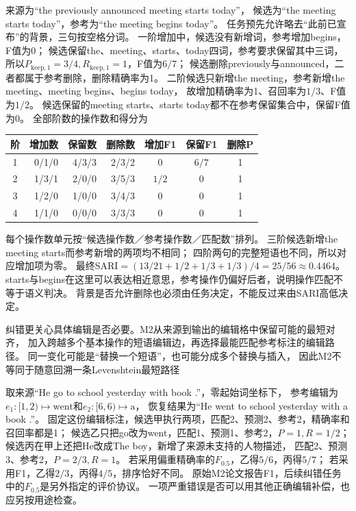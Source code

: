 来源为“the previously announced meeting starts today”，
候选为“the meeting starts today”，参考为“the meeting begins today”。
任务预先允许略去“此前已宣布”的背景，三句按空格分词。
一阶增加中，候选没有新增词，参考增加begins，F值为0；
候选保留the、meeting、starts、today四词，参考要求保留其中三词，
所以$P_{\mathrm{keep},1}=3/4,R_{\mathrm{keep},1}=1$，F值为$6/7$；
候选删除previously与announced，二者都属于参考删除，删除精确率为1。
二阶候选只新增the meeting，参考新增the meeting、meeting begins、begins today，
故增加精确率为1、召回率为$1/3$、F值为$1/2$。
候选保留的meeting starts、starts today都不在参考保留集合中，保留F值为0。
全部阶数的操作数和得分为
\begin{center}
  \small
  \begin{tabular}{@{}crrrccc@{}}
    \toprule
    阶 & 增加数 & 保留数 & 删除数 & 增加F1 & 保留F1 & 删除P\\
    \midrule
    1 & 0/1/0 & 4/3/3 & 2/3/2 & 0 & $6/7$ & 1\\
    2 & 1/3/1 & 2/0/0 & 3/5/3 & $1/2$ & 0 & 1\\
    3 & 1/2/0 & 1/0/0 & 3/4/3 & 0 & 0 & 1\\
    4 & 1/1/0 & 0/0/0 & 3/3/3 & 0 & 0 & 1\\
    \bottomrule
  \end{tabular}
\end{center}
每个操作数单元按“候选操作数／参考操作数／匹配数”排列。
三阶候选新增the meeting starts而参考新增的两项均不相同；
四阶两句的完整短语也不同，所以对应增加项为零。
最终$\mathrm{SARI}=(13/21+1/2+1/3+1/3)/4=25/56\approx0.4464$。
starts与begins在这里可以表达相近意思，参考操作仍偏好后者，说明操作匹配不等于语义判决。
背景是否允许删除也必须由任务决定，不能反过来由SARI高低决定。

纠错更关心具体编辑是否必要。M2从来源到输出的编辑格中保留可能的最短对齐，
加入跨越多个基本操作的短语编辑边，再选择最能匹配参考标注的编辑路径。
同一变化可能是“替换一个短语”，也可能分成多个替换与插入，
因此M2不等同于随意回溯一条Levenshtein最短路径

取来源“He go to school yesterday with book .”，零起始词坐标下，
参考编辑为$e_1: [1,2)\mapsto\text{went}$和$e_2:[6,6)\mapsto\text{a}$，
恢复结果为“He went to school yesterday with a book .”。
固定这份编辑标注，候选甲执行两项，匹配2、预测2、参考2，精确率和召回率都是1；
候选乙只把go改为went，匹配1、预测1、参考2，$P=1,R=1/2$；
候选丙在甲上还把He改成The boy，新增了来源未支持的人物描述，
匹配2、预测3、参考2，$P=2/3,R=1$。
若采用偏重精确率的$F_{0.5}$，乙得$5/6$，丙得$5/7$；
若采用F1，乙得$2/3$，丙得$4/5$，排序恰好不同。
原始M2论文报告F1，后续纠错任务中的$F_{0.5}$是另外指定的评价协议。
一项严重错误是否可以用其他正确编辑补偿，也应另按用途检查。


